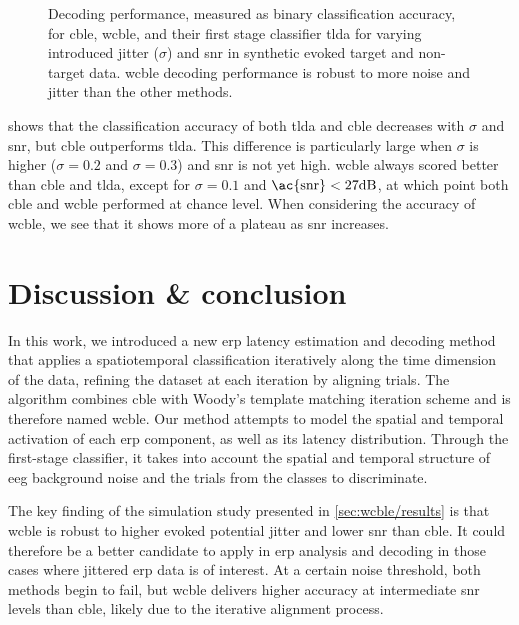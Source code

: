 \begin{figure}
  \sffamily\sansmath
  
  \caption[Synthetic decoding results]{Decoding performance, measured as binary
  classification accuracy, for \ac{cble}, \ac{wcble}, and their first stage
  classifier \ac{tlda} for varying introduced jitter ($\sigma$) and \ac{snr} in
  synthetic evoked target and non-target data.
  \Ac{wcble} decoding performance is robust to more noise and jitter than the other methods.}
  \label{fig:wcble/results/accuracy}
\end{figure}

 shows that the classification accuracy of both \ac{tlda} and \ac{cble} decreases with
$\sigma$ and \ac{snr}, but \ac{cble} outperforms \ac{tlda}.
This difference is particularly large when $\sigma$ is higher ($\sigma=0.2$
and $\sigma=0.3$) and \ac{snr} is not yet high.
\Ac{wcble} always scored better than \ac{cble} and \ac{tlda}, except for
$\sigma=0.1$ and $\text{\ac{snr}} < 27 \text{dB}$, at which point both \ac{cble}
and \ac{wcble} performed at chance level.
When considering the accuracy of \ac{wcble}, we see that it shows more of a
plateau as \ac{snr} increases.

\section{Discussion \& conclusion}

In this work, we introduced a new \ac{erp} latency estimation and decoding
method that applies a spatiotemporal classification iteratively along the time
dimension of the data, refining the dataset at each iteration by aligning
trials.
The algorithm combines \acf{cble} with Woody's template matching iteration
scheme and is therefore named \acf{wcble}.
Our method attempts to model the spatial and temporal activation of
each \ac{erp} component, as well as its latency distribution.
Through the first-stage classifier, it takes into account the
spatial and temporal structure of \ac{eeg} background noise and the trials from the
classes to discriminate.

The key finding of the simulation study presented
in \cref{sec:wcble/results} is that \ac{wcble} is robust to higher evoked
potential jitter and lower \ac{snr} than \ac{cble}.
It could therefore be a better candidate to apply in \ac{erp} analysis and
decoding in those cases where jittered \ac{erp} data is of interest.
At a certain noise threshold, both methods begin to fail, but \ac{wcble}
delivers higher accuracy at intermediate \ac{snr} levels than \ac{cble}, likely due to the iterative alignment process.

